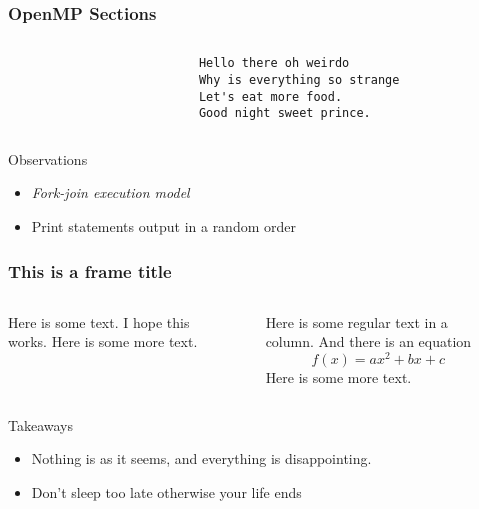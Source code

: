 \documentclass[handout]{beamer}
\begin{document}
\begin{frame}[fragile]
  \frametitle{OpenMP Sections}
  \begin{columns}[t]%
    \begin{column}{0.65\textwidth}
      \inputminted{c}{src/ex1.c}
    \end{column}
    \pause
    \begin{column}{0.4\textwidth}
      \begin{verbatim}
        Hello there oh weirdo
        Why is everything so strange
        Let's eat more food.
        Good night sweet prince.
      \end{verbatim}
    \end{column}
  \end{columns}
  \pause
  \begin{block}{Observations}
    \begin{itemize}
    \item \emph{Fork-join execution model}
    \item Print statements output in a random order
    \end{itemize}
  \end{block}
\end{frame}
\begin{frame}
  \frametitle{This is a frame title}
  \begin{columns}[onlytextwidth]
    \begin{column}{0.4\textwidth}
      \centering
      Here is some text. I hope this works. Here is some more text.
    \end{column}
    \begin{column}{0.2\textwidth}
      \centering
      \rule{40pt}{150pt}%
    \end{column}
    \begin{column}{0.4\textwidth}
    Here is some regular text in a column. And there is an equation
    \[
      f(x)=ax^2+bx+c
    \]
    Here is some more text.
    \end{column}
​  \end{columns}
  \begin{block}{Takeaways}
    \begin{itemize}
    \item Nothing is as it seems, and everything is disappointing.
    \item Don't sleep too late otherwise your life ends
    \end{itemize}
  \end{block}

\end{frame}
\end{document}
